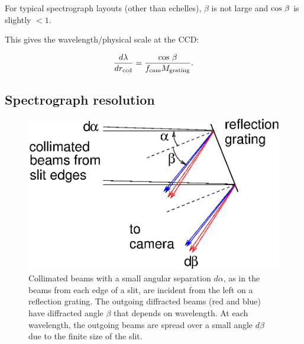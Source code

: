 \documentclass[12pt]{article}
\newcommand{\subscript}[1]{\mathrm{#1}}
\newcommand{\ccd}{\subscript{ccd}}
\newcommand{\cam}{\subscript{cam}}
\newcommand{\grating}{\subscript{grating}}
\begin{document}
For typical spectrograph layouts (other than echelles), $\beta$
is not large and ${\rm cos}\ \beta$ is slightly $<1$.


This gives the wavelength/physical scale at the CCD:

$$  \frac{d\lambda}{dr_{\ccd}} = \frac{{\rm cos}~\beta}{f_{\cam}  M_{\grating}}. $$


\subsection{Spectrograph resolution}

\begin{figure}[ht]
\centerline{
\includegraphics[width=4.5truein]{gratingslit.eps}
}
\caption{Collimated beams with a small angular separation $d\alpha$, 
as in the beams from each edge of a slit, are incident from the left 
on a reflection grating.
The outgoing diffracted beams (red and blue) have diffracted angle
$\beta$ that depends on wavelength.  At each wavelength, the
outgoing beams are spread over a small angle $d\beta$ due to
the finite size of the slit.
}
\label{fig-gratingslit}
\end{figure}
\end{document}
